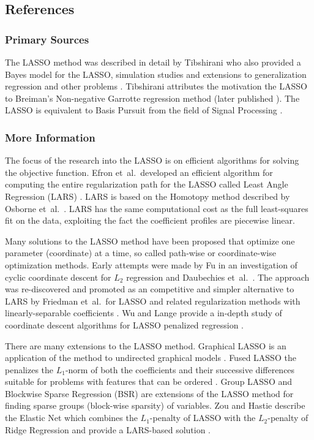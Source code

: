 \subsection{References}

\subsubsection{Primary Sources}
The LASSO method was described in detail by Tibshirani who also provided a Bayes model for the LASSO, simulation studies and extensions to generalization regression and other problems \cite{Tibshirani1996}. Tibshirani attributes the motivation the LASSO to Breiman's Non-negative Garrotte regression method \cite{Breiman1993} (later published \cite{Breiman1995}).
The LASSO is equivalent to Basis Pursuit from the field of Signal Processing \cite{Chen1998}.

\subsubsection{More Information}
The focus of the research into the LASSO is on efficient algorithms for solving the objective function.
Efron et~al.\ developed an efficient algorithm for computing the entire regularization path for the LASSO called Least Angle Regression (LARS) \cite{Efron2002}. LARS is based on the Homotopy method described by Osborne et~al.\ \cite{Osborne2000}. LARS has the same computational cost as the full least-squares fit on the data, exploiting the fact the coefficient profiles are piecewise linear.

Many solutions to the LASSO method have been proposed that optimize one parameter (coordinate) at a time, so called path-wise or coordinate-wise optimization methods. Early attempts were made by Fu in an investigation of cyclic coordinate descent for $L_2$ regression \cite{Fu1998} and Daubechies et~al.\ \cite{Daubechies2004}. The approach was re-discovered and promoted as an competitive and simpler alternative to LARS by Friedman et~al.\ for LASSO and related regularization methods with linearly-separable coefficients \cite{Friedman2007}. Wu and Lange provide a in-depth study of coordinate descent algorithms for LASSO penalized regression \cite{Wu2008}.

There are many extensions to the LASSO method.
Graphical LASSO is an application of the method to undirected graphical models \cite{Friedman2008a}.
Fused LASSO the penalizes the $L_1$-norm of both the coefficients and their successive differences suitable for problems with features that can be ordered \cite{Tibshirani2005}.
Group LASSO \cite{Yuan2006} and Blockwise Sparse Regression (BSR) \cite{Kim2006} are extensions of the LASSO method for finding sparse groups (block-wise sparsity) of variables.
Zou and Hastie describe the Elastic Net which combines the $L_1$-penalty of LASSO with the $L_2$-penalty of Ridge Regression and provide a LARS-based solution \cite{Zou2005}.


